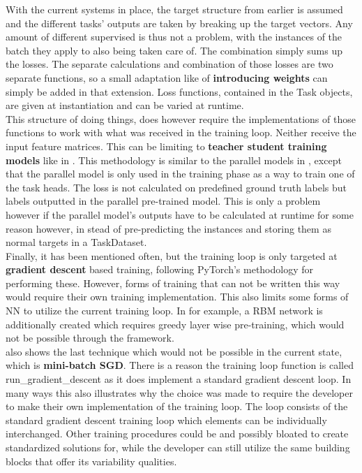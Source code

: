 With the current systems in place, the target structure from earlier is assumed and the different tasks' outputs are taken by breaking up the target vectors. Any amount of different supervised is thus not a problem, with the instances of the batch they apply to also being taken care of. The combination simply sums up the losses. The separate calculations and combination of those losses are two separate functions, so a small adaptation like \cite{park2020augmenting} of \textbf{introducing weights} can simply be added in that extension. Loss functions, contained in the Task objects, are given at instantiation and can be varied at runtime.\\

This structure of doing things, does however require the implementations of those functions to work with what was received in the training loop. Neither receive the input feature matrices. This can be limiting to \textbf{teacher student training models} like in \cite{imoto2020sound}. This methodology is similar to the parallel models in \cite{wu2020domain}, except that the parallel model is only used in the training phase as a way to train one of the task heads. The loss is not calculated on predefined ground truth labels but labels outputted in the parallel pre-trained model. This is only a problem however if the parallel model's outputs have to be calculated at runtime for some reason however, in stead of pre-predicting the instances and storing them as normal targets in a TaskDataset. \\

Finally, it has been mentioned often, but the training loop is only targeted at \textbf{gradient descent} based training, following PyTorch's methodology for performing these. However, forms of training that can not be written this way would require their own training implementation. This also limits some forms of NN to utilize the current training loop. In \cite{georgiev2017heterogeneous} for example, a RBM network is additionally created which requires greedy layer wise pre-training, which would not be possible through the framework.\\

\cite{georgiev2017heterogeneous} also shows the last technique which would not be possible in the current state, which is \textbf{mini-batch SGD}. There is a reason the training loop function is called run\_gradient\_descent as it does implement a standard gradient descent loop. In many ways this also illustrates why the choice was made to require the developer to make their own implementation of the training loop. The loop consists of the standard gradient descent training loop which elements can be individually interchanged. Other training procedures could be and possibly bloated to create standardized solutions for, while the developer can still utilize the same building blocks that offer its variability qualities.\\

